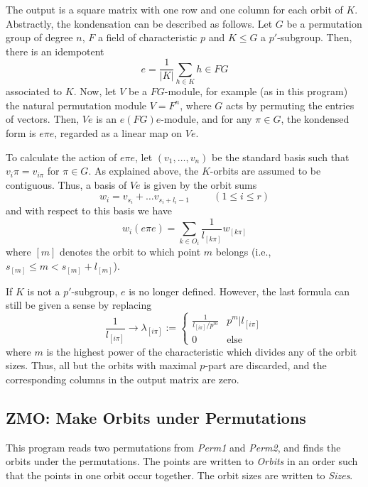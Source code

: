 The output is a square matrix with one row and one column for each
orbit of $K$. Abstractly, the kondensation can be described as follows.
Let $G$ be a permutation group of degree $n$, $F$ a field of
characteristic $p$ and $K\leq G$ a $p'$-subgroup. Then, there is an
idempotent
\[
	e = \frac{1}{|K|} \sum_{h\in K} h \in FG
\]
associated to $K$. Now, let $V$ be a $FG$-module, for example (as in
this program) the natural permutation module $V=F^n$, where $G$ acts
by permuting the entries of vectors. Then, $Ve$ is an $e(FG)e$-module,
and for any $\pi\in G$, the kondensed form is $e\pi e$, regarded as a
linear map on $Ve$.

To calculate the action of $e\pi e$, let $(v_1,\ldots,v_n)$ be the
standard basis such that $v_i\pi=v_{i\pi}$ for $\pi\in G$. As explained
above, the $K$-orbits are assumed to be contiguous. Thus, a basis of
$Ve$ is given by the orbit sums
\[
	w_i = v_{s_i}+\ldots v_{s_i+l_i-1}\hspace{1cm}(1\leq i\leq r)
\]
and with respect to this basis we have
\[
	w_i (e\pi e) = \sum_{k\in O_i} \frac{1}{l_{[k\pi]}} w_{[k\pi]}
\]
where $[m]$ denotes the orbit to which point $m$ belongs (i.e.,
$s_{[m]}\leq m<s_{[m]}+l_{[m]}$).

If $K$ is not a $p'$-subgroup, $e$ is no longer defined. However, the
last formula can still be given a sense by replacing
\[
	\frac{1}{l_{[i\pi]}} \to \lambda_{[i\pi]}:=
	\left\{\begin{array}{ll}
	\frac{1}{l_{[i\pi]}/p^m}  & p^m|l_{[i\pi]}\\
	0                         & \mbox{else}
	\end{array}\right.
\]
where $m$ is the highest power of the characteristic which divides
any of the orbit sizes. Thus, all but the orbits with maximal $p$-part
are discarded, and the corresponding columns in the output matrix are
zero.


\subsection{ZMO: Make Orbits under Permutations}
\Syntax
{}

\Description
This program reads two permutations from {\it Perm1} and {\it Perm2},
and finds the orbits under the permutations. The points are written
to {\it Orbits} in an order such that the points in one orbit
occur together. The orbit sizes are written to {\it Sizes}.

